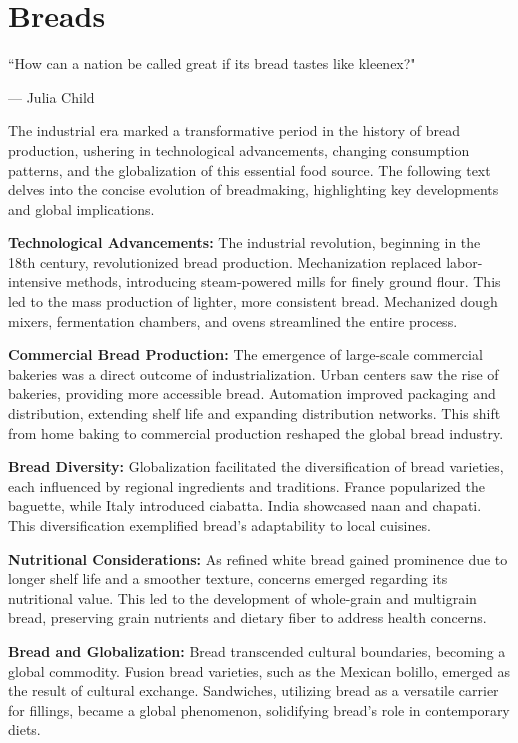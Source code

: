 \chapter{Breads}
\label{breads}
\epigraph{``How can a nation be called great if its bread tastes like kleenex?"}{--- \textup{Julia Child}}

The industrial era marked a transformative period in the history of bread production, ushering in technological advancements, changing consumption patterns, and the globalization of this essential food source. The following text delves into the concise evolution of breadmaking, highlighting key developments and global implications.

\textbf{Technological Advancements:} The industrial revolution, beginning in the 18th century, revolutionized bread production. Mechanization replaced labor-intensive methods, introducing steam-powered mills for finely ground flour. This led to the mass production of lighter, more consistent bread. Mechanized dough mixers, fermentation chambers, and ovens streamlined the entire process.

\textbf{Commercial Bread Production:} The emergence of large-scale commercial bakeries was a direct outcome of industrialization. Urban centers saw the rise of bakeries, providing more accessible bread. Automation improved packaging and distribution, extending shelf life and expanding distribution networks. This shift from home baking to commercial production reshaped the global bread industry.

\textbf{Bread Diversity:} Globalization facilitated the diversification of bread varieties, each influenced by regional ingredients and traditions. France popularized the baguette, while Italy introduced ciabatta. India showcased naan and chapati. This diversification exemplified bread's adaptability to local cuisines.

\textbf{Nutritional Considerations:} As refined white bread gained prominence due to longer shelf life and a smoother texture, concerns emerged regarding its nutritional value. This led to the development of whole-grain and multigrain bread, preserving grain nutrients and dietary fiber to address health concerns.

\textbf{Bread and Globalization:} Bread transcended cultural boundaries, becoming a global commodity. Fusion bread varieties, such as the Mexican bolillo, emerged as the result of cultural exchange. Sandwiches, utilizing bread as a versatile carrier for fillings, became a global phenomenon, solidifying bread's role in contemporary diets.


